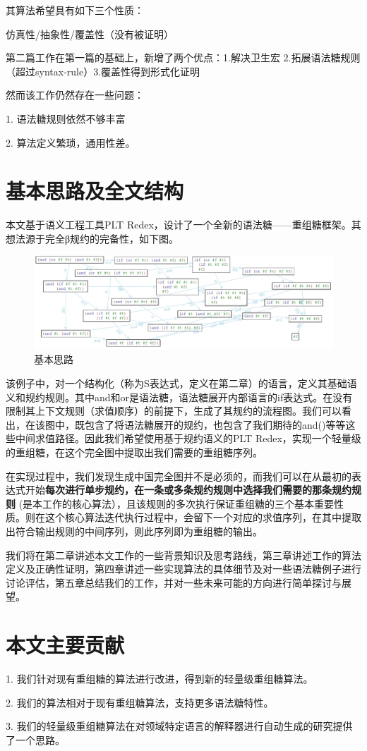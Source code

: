 其算法希望具有如下三个性质：

仿真性/抽象性/覆盖性（没有被证明）

第二篇工作在第一篇的基础上，新增了两个优点：1.解决卫生宏 2.拓展语法糖规则（超过syntax-rule）3.覆盖性得到形式化证明

然而该工作仍然存在一些问题：

1.	语法糖规则依然不够丰富

2.	算法定义繁琐，通用性差。
\section{基本思路及全文结构}

本文基于语义工程工具PLT Redex，设计了一个全新的语法糖——重组糖框架。其想法源于完全β规约的完备性，如下图。

\begin{figure}[h]
	\centering
	\includegraphics[width=12cm]{images/chapter1/example.png}
	\caption{基本思路}
\end{figure}

该例子中，对一个结构化（称为S表达式，定义在第二章）的语言，定义其基础语义和规约规则。其中and和or是语法糖，语法糖展开内部语言的if表达式。在没有限制其上下文规则（求值顺序）的前提下，生成了其规约的流程图。我们可以看出，在该图中，既包含了将语法糖展开的规约，也包含了我们期待的and()等等这些中间求值路径。因此我们希望使用基于规约语义的PLT Redex，实现一个轻量级的重组糖，在这个完全图中提取出我们需要的重组糖序列。

在实现过程中，我们发现生成中国完全图并不是必须的，而我们可以在从最初的表达式开始{\bfseries 每次进行单步规约，在一条或多条规约规则中选择我们需要的那条规约规则 }(是本工作的核心算法），且该规则的多次执行保证重组糖的三个基本重要性质。则在这个核心算法迭代执行过程中，会留下一个对应的求值序列，在其中提取出符合输出规则的中间序列，则此序列即为重组糖的输出。

我们将在第二章讲述本文工作的一些背景知识及思考路线，第三章讲述工作的算法定义及正确性证明，第四章讲述一些实现算法的具体细节及对一些语法糖例子进行讨论评估，第五章总结我们的工作，并对一些未来可能的方向进行简单探讨与展望。

\section{本文主要贡献}
1.	我们针对现有重组糖的算法进行改进，得到新的轻量级重组糖算法。

2.	我们的算法相对于现有重组糖算法，支持更多语法糖特性。

3.	我们的轻量级重组糖算法在对领域特定语言的解释器进行自动生成的研究提供了一个思路。


